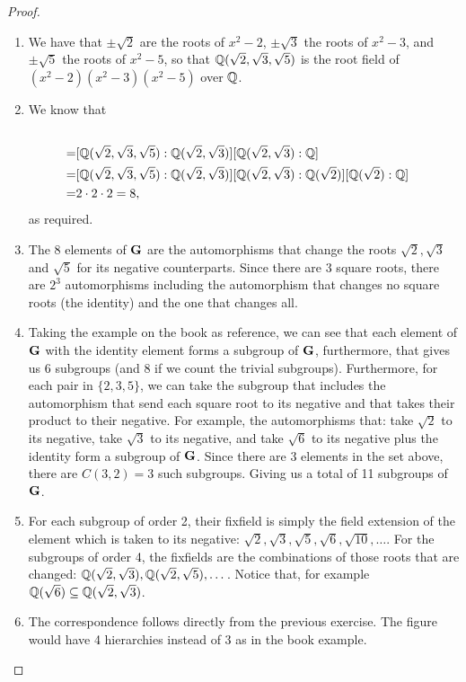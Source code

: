 \begin{proof}
 \begin{enumerate}
     \item We have that $\pm\sqrt{2}$ are the roots of $x^2-2$, $\pm\sqrt{3}$ the roots of $x^2-3$, and $\pm\sqrt{5}$ the roots of $x^2-5$, so that $\mathbb{Q}(\sqrt{2},\sqrt{3},\sqrt{5})$ is the root field of $(x^2-2)(x^2-3)(x^2-5)$ over $\mathbb{Q}$.
     \item We know that 
     \begin{align*}
         [\Q(\sqrt{2}&,\sqrt{3},\sqrt{5}):\Q]\\
         =& [\Q(\sqrt{2},\sqrt{3},\sqrt{5}):\Q(\sqrt{2},\sqrt{3})][\Q(\sqrt{2},\sqrt{3}):\Q]\\
         =& [\Q(\sqrt{2},\sqrt{3},\sqrt{5}):\Q(\sqrt{2},\sqrt{3})][\Q(\sqrt{2},\sqrt{3}):\Q(\sqrt{2})][\Q(\sqrt{2}):\Q]\\
         =& 2\cdot 2\cdot 2=8,
     \end{align*}
     as required.
     \item The 8 elements of $\mathbf{G}$ are the automorphisms that change the roots $\sqrt{2},\sqrt{3}$ and $\sqrt{5}$ for its negative counterparts. Since there are 3 square roots, there are $2^3$ automorphisms including the automorphism that changes no square roots (the identity) and the one that changes all. 
     \item Taking the example on the book as reference, we can see that each element of $\mathbf{G}$ with the identity element forms a subgroup of $\mathbf{G}$, furthermore, that gives us 6 subgroups (and 8 if we count the trivial subgroups). Furthermore, for each pair in $\{2,3,5\}$, we can take the subgroup that includes the automorphism that send each square root to its negative and that takes their product to their negative. For example, the automorphisms that: take $\sqrt{2}$ to its negative, take $\sqrt{3}$ to its negative, and take $\sqrt{6}$ to its negative plus the identity form a subgroup of $\mathbf{G}$. Since there are 3 elements in the set above, there are $C(3,2)=3$ such subgroups. Giving us a total of 11 subgroups of $\mathbf{G}$.
     \item For each subgroup of order 2, their fixfield is simply the field extension of the element which is taken to its negative: $\sqrt{2}, \sqrt{3}, \sqrt{5},\sqrt{6}, \sqrt{10},\dots$. For the subgroups of order 4, the  fixfields are the combinations of those roots that are changed: $\mathbb{Q}(\sqrt{2},\sqrt{3}), \mathbb{Q}(\sqrt{2},\sqrt{5}),\dots$. Notice that, for example $\mathbb{Q}(\sqrt{6})\subseteq\mathbb{Q}(\sqrt{2},\sqrt{3})$.
     \item The correspondence follows directly from the previous exercise. The figure would have 4 hierarchies instead of 3 as in the book example.
 \end{enumerate}
\end{proof}

